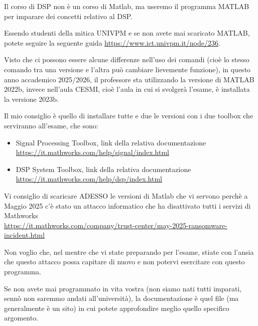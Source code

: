 \begin{tcolorbox}
    Il corso di DSP non è un corso di Matlab, ma useremo il programma MATLAB per imparare dei concetti relativo al DSP. \newline 

    Essendo studenti della mitica UNIVPM e se non avete mai scaricato MATLAB, 
    potete seguire la seguente guida \url{https://www.ict.univpm.it/node/236}. \newline 

    Visto che ci possono essere alcune differenze nell'uso dei comandi (cioè lo stesso comando tra una versione e l'altra può cambiare lievemente funzione), 
    in questo anno accademico 2025/2026, 
    il professore sta utilizzando la versione di MATLAB 2022b, invece nell'aula CESMI, cioè l'aula in cui si svolgerà l'esame, 
    è installata la versione 2023b. \newline 

    Il mio consiglio è quello di installare tutte e due le versioni con i due toolbox che serviranno all'esame, che sono: 
    
    \begin{itemize}
        \item Signal Processing Toolbox, link della relativa documentazione \url{https://it.mathworks.com/help/signal/index.html}
        \item DSP System Toolbox, link della relativa documentazione \url{https://it.mathworks.com/help/dsp/index.html}  
    \end{itemize}
    
    Vi consiglio di scaricare ADESSO le versioni di Matlab che vi servono perchè a Maggio 2025 c'è stato un attacco informatico che ha disattivato tutti i servizi di Mathworks \\ 
    \url{https://it.mathworks.com/company/trust-center/may-2025-ransomware-incident.html} \newline 
    
    Non voglio che, nel mentre che vi state preparando per l'esame, stiate con l'ansia che questo attacco possa capitare di nuovo e non potervi esercitare con questo programma. \newline 

    Se non avete mai programmato in vita vostra (non siamo nati tutti imparati, sennò non saremmo andati all'università), 
    la documentazione è quel file (ma generalmente è un sito) in cui potete approfondire meglio quello specifico argomento. \newline 


\end{tcolorbox}
